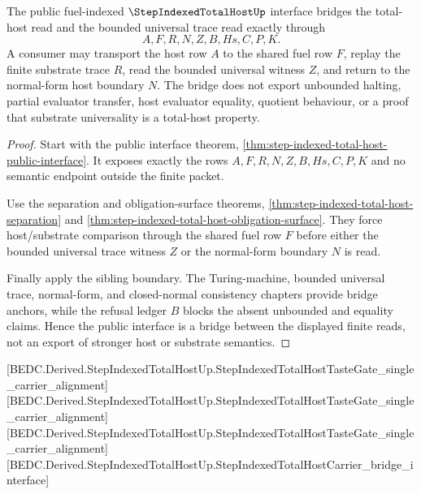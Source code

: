 \begin{theorem}
\label{thm:step-indexed-total-host-bridge-interface}
The public fuel-indexed $\StepIndexedTotalHostUp$ interface bridges the total-host read and the bounded universal trace read exactly through
$$
A,F,R,N,Z,B,Hs,C,P,K .
$$
A consumer may transport the host row $A$ to the shared fuel row $F$, replay the finite substrate trace $R$, read the bounded universal witness $Z$, and return to the normal-form host boundary $N$. The bridge does not export unbounded halting, partial evaluator transfer, host evaluator equality, quotient behaviour, or a proof that substrate universality is a total-host property.
\end{theorem}
\begin{proof}
Start with the public interface theorem, \autoref{thm:step-indexed-total-host-public-interface}. It exposes exactly the rows $A,F,R,N,Z,B,Hs,C,P,K$ and no semantic endpoint outside the finite packet.

Use the separation and obligation-surface theorems, \autoref{thm:step-indexed-total-host-separation} and \autoref{thm:step-indexed-total-host-obligation-surface}. They force host/substrate comparison through the shared fuel row $F$ before either the bounded universal trace witness $Z$ or the normal-form boundary $N$ is read.

Finally apply the sibling boundary. The Turing-machine, bounded universal trace, normal-form, and closed-normal consistency chapters provide bridge anchors, while the refusal ledger $B$ blocks the absent unbounded and equality claims. Hence the public interface is a bridge between the displayed finite reads, not an export of stronger host or substrate semantics.
\end{proof}

[BEDC.Derived.StepIndexedTotalHostUp.StepIndexedTotalHostTasteGate\_single\_carrier\_alignment]
[BEDC.Derived.StepIndexedTotalHostUp.StepIndexedTotalHostTasteGate\_single\_carrier\_alignment]
[BEDC.Derived.StepIndexedTotalHostUp.StepIndexedTotalHostTasteGate\_single\_carrier\_alignment]
[BEDC.Derived.StepIndexedTotalHostUp.StepIndexedTotalHostCarrier\_bridge\_interface]

